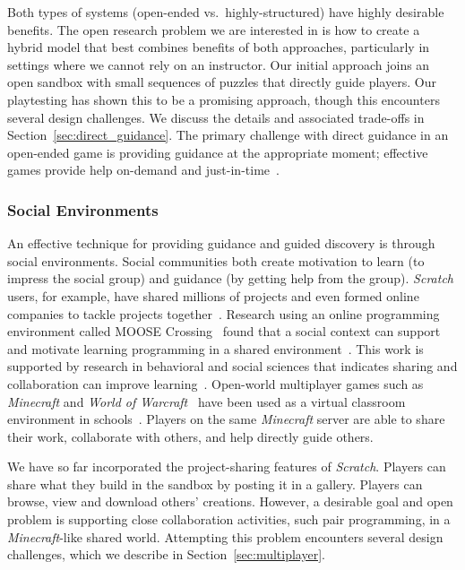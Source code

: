 \documentclass{sig-alternate}
\newcommand{\TODO}[1]{{\color{red} TODO: #1}}
\begin{document}
Both types of systems (open-ended vs.\ highly-structured) have highly desirable benefits.
The open research problem we are interested in is how to create a hybrid model that best combines benefits of both approaches, particularly in settings where we cannot rely on an instructor.
Our initial approach joins an open sandbox with small sequences of puzzles that directly guide players.
Our playtesting has shown this to be a promising approach, though this encounters several design challenges. We discuss the details and associated trade-offs in Section~\ref{sec:direct_guidance}.
The primary challenge with direct guidance in an open-ended game is providing guidance at the appropriate moment;
effective games provide help on-demand and just-in-time~\cite{gee2003video}.

\subsubsection{Social Environments}
\label{sec:social}

An effective technique for providing guidance and guided discovery is through social environments.
Social communities both create motivation to learn (to impress the social group) and guidance (by getting help from the group).
\emph{Scratch} users, for example, have shared millions of projects and even formed online companies to tackle projects together~\cite{resnick2009scratch}. 
Research using an online programming environment called MOOSE Crossing~\cite{bruckman1997moose} found that a social context can support and motivate learning programming in a shared environment~\cite{bruckman2000situated}.
This work is supported by research in behavioral and social sciences that indicates sharing and collaboration can improve learning~\cite{bransford2000people}. 
Open-world multiplayer games such as \emph{Minecraft} and \emph{World of Warcraft}~\cite{worldofwarcraft} have been used as a virtual classroom environment in schools~\cite{gillispie14from}.
Players on the same \emph{Minecraft} server are able to share their work, collaborate with others, and help directly guide others.


We have so far incorporated the project-sharing features of \emph{Scratch}.
Players can share what they build in the sandbox by posting it in a gallery.
Players can browse, view and download others' creations.
However, a desirable goal and open problem is supporting close collaboration activities, such pair programming, in a \emph{Minecraft}-like shared world.
Attempting this problem encounters several design challenges, which we describe in Section~\ref{sec:multiplayer}.
\end{document}
